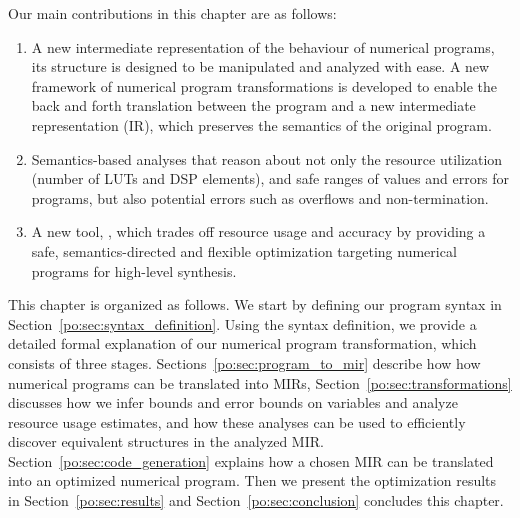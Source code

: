Our main contributions in this chapter are as follows:
\begin{enumerate}
    \vspace{-6pt}
    \item
        A new intermediate representation of the behaviour of numerical
        programs, its structure is designed to be manipulated and analyzed
        with ease.  A new framework of numerical program transformations is
        developed to enable the back and forth translation between the program
        and a new intermediate representation (IR), which preserves the
        semantics of the original program.
    \vspace{-6pt}
    \item
        Semantics-based analyses that reason about not only the resource
        utilization (number of LUTs and DSP elements), and safe ranges of
        values and errors for programs, but also potential errors such as
        overflows and non-termination.
    \vspace{-6pt}
    \item
        A new tool, \newsoap, which trades off resource usage and accuracy
        by providing a safe, semantics-directed and flexible optimization
        targeting numerical programs for high-level synthesis.
    \vspace{-6pt}
\end{enumerate}

This chapter is organized as follows.  We start by defining our program syntax
in Section~\ref{po:sec:syntax_definition}.  Using the syntax definition, we
provide a detailed formal explanation of our numerical program transformation,
which consists of three stages.  Sections~\ref{po:sec:program_to_mir}
describe how how numerical programs can be translated into MIRs,
Section~\ref{po:sec:transformations} discusses how we infer bounds and
error bounds on variables and analyze resource usage estimates, and how
these analyses can be used to efficiently discover equivalent structures
in the analyzed MIR\@.  Section~\ref{po:sec:code_generation} explains how
a chosen MIR can be translated into an optimized numerical program.  Then
we present the optimization results in Section~\ref{po:sec:results} and
Section~\ref{po:sec:conclusion} concludes this chapter.
